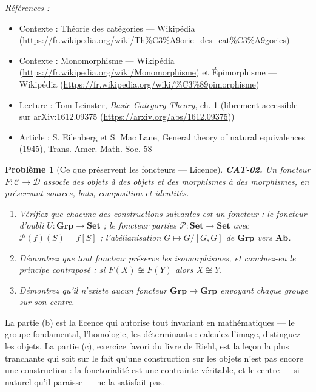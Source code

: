 \documentclass[11pt]{article}
\newtheorem{problem}{Problème}
\newenvironment{refs}{\par\small\noindent\emph{Références :}\begin{itemize}\setlength\itemsep{0pt}}{\end{itemize}\normalsize}
\begin{document}
\begin{refs}
\item Contexte : Théorie des catégories --- Wikipédia (\url{https://fr.wikipedia.org/wiki/Th%C3%A9orie_des_cat%C3%A9gories})
\item Contexte : Monomorphisme --- Wikipédia (\url{https://fr.wikipedia.org/wiki/Monomorphisme}) et Épimorphisme --- Wikipédia (\url{https://fr.wikipedia.org/wiki/%C3%89pimorphisme})
\item Lecture : Tom Leinster, \textit{Basic Category Theory}, ch. 1 (librement accessible sur arXiv:1612.09375 (\url{https://arxiv.org/abs/1612.09375}))
\item Article : S. Eilenberg et S. Mac Lane, \og{} General theory of natural equivalences \fg{} (1945), Trans. Amer. Math. Soc. 58
\end{refs}

\bigskip

\begin{problem}[{Ce que préservent les foncteurs --- Licence}]
\textbf{CAT-02.} Un foncteur $ F\colon \mathcal{C} \to \mathcal{D} $
associe des objets à des objets et des morphismes à des morphismes, en préservant sources, buts,
composition et identités.
\begin{enumerate}
\item[(a)] Vérifiez que chacune des constructions suivantes est un foncteur : le foncteur d'oubli
$ U\colon \mathbf{Grp} \to \mathbf{Set} $ ; le foncteur parties
$ \mathcal{P}\colon \mathbf{Set} \to \mathbf{Set} $ avec $ \mathcal{P}(f)(S) = f[S] $ ;
l'abélianisation $ G \mapsto G/[G,G] $ de $ \mathbf{Grp} $ vers $ \mathbf{Ab} $.
\item[(b)] Démontrez que tout foncteur préserve les isomorphismes, et concluez-en le principe
contraposé : si $ F(X) \not\cong F(Y) $ alors $ X \not\cong Y $.
\item[(c)] Démontrez qu'il n'existe
\textit{aucun} foncteur $ \mathbf{Grp} \to \mathbf{Grp} $ envoyant chaque groupe sur son centre.
\end{enumerate}

\end{problem}

\noindent La partie (b) est la licence qui autorise tout invariant en mathématiques --- le
groupe fondamental, l'homologie, les déterminants : calculez l'image, distinguez les objets. La
partie (c), exercice favori du livre de Riehl, est la leçon la plus tranchante qui soit sur le
fait qu'une \og{} construction sur les objets \fg{} n'est pas encore une construction : la fonctorialité
est une contrainte véritable, et le centre --- si naturel qu'il paraisse --- ne la satisfait pas.
\end{document}
